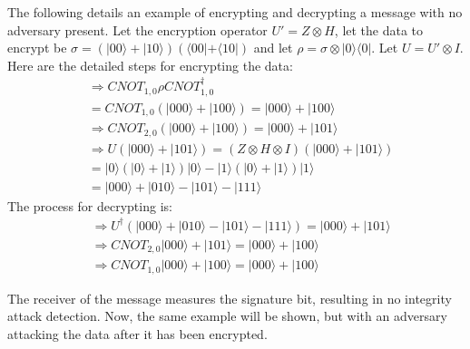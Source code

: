 \begin{example}
\label{ex:EnhancedClifford1}
	The following details an example of encrypting and decrypting a message with no adversary present. Let the encryption operator $U' = Z \otimes H$, let the data to encrypt be $\sigma = (|00\rangle + |10\rangle) (\langle00| + \langle10|)$ and let $\rho = \sigma \otimes |0\rangle \langle0|$. Let $U = U' \otimes I$. Here are the detailed steps for encrypting the data:
	\begin{align}
	& \Rightarrow \mathit{CNOT}_{1,0}\rho \mathit{CNOT}_{1,0}^{\dagger} \\ 
	&= \mathit{CNOT}_{1,0}(|000\rangle + |100\rangle) = |000\rangle + |100\rangle\\
	& \Rightarrow \mathit{CNOT}_{2,0}(|000\rangle + |100\rangle) = |000\rangle + |101\rangle\\
	& \Rightarrow U(|000\rangle + |101\rangle) = (Z \otimes H \otimes I)(|000\rangle + |101\rangle)\\ 
	&= |0\rangle(|0\rangle + |1\rangle)|0\rangle - |1\rangle(|0\rangle + |1\rangle)|1\rangle\\
	&= |000\rangle + |010\rangle - |101\rangle - |111\rangle
	\end{align}
	The process for decrypting is:
	\begin{align}
	& \Rightarrow U^{\dagger}(|000\rangle + |010\rangle - |101\rangle - |111\rangle) = |000\rangle + |101\rangle\\ 
	& \Rightarrow \mathit{CNOT}_{2,0} |000\rangle + |101\rangle = |000\rangle + |100\rangle\\
	& \Rightarrow \mathit{CNOT}_{1,0} |000\rangle + |100\rangle = |000\rangle + |100\rangle
	\end{align}
\end{example}
The receiver of the message measures the signature bit, resulting in no integrity attack detection. Now, the same example will be shown, but with an adversary attacking the data after it has been encrypted.
